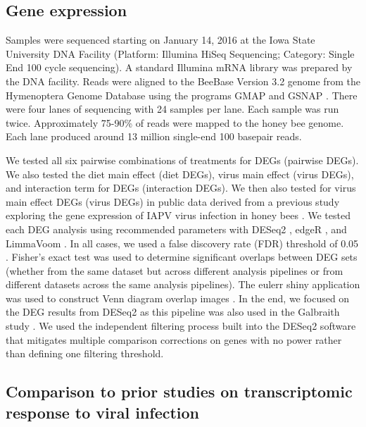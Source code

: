\documentclass{bmcart}
\begin{document}
\begin{linenumbers}
\begin{doublespacing}
\subsection*{Gene expression}

Samples were sequenced starting on January 14, 2016 at the Iowa State University DNA Facility (Platform: Illumina HiSeq Sequencing; Category: Single End 100 cycle sequencing). A standard Illumina mRNA library was prepared by the DNA facility. Reads were aligned to the BeeBase Version 3.2 genome \cite{hbGenome} from the Hymenoptera Genome Database \cite{hymenopteraDB} using the programs GMAP and GSNAP \cite{gsnap}. There were four lanes of sequencing with 24 samples per lane. Each sample was run twice. Approximately 75-90\% of reads were mapped to the honey bee genome. Each lane produced around 13 million single-end 100 basepair reads.

We tested all six pairwise combinations of treatments for DEGs (pairwise DEGs). We also tested the diet main effect (diet DEGs), virus main effect (virus DEGs), and interaction term for DEGs (interaction DEGs). We then also tested for virus main effect DEGs (virus DEGs) in public data derived from a previous study exploring the gene expression of IAPV virus infection in honey bees \cite{galbraith}. We tested each DEG analysis using recommended parameters with DESeq2 \cite{deseq2}, edgeR \cite{edger}, and LimmaVoom \cite{limma}. In all cases, we used a false discovery rate (FDR) threshold of 0.05 \cite{benjamini}. Fisher's exact test was used to determine significant overlaps between DEG sets (whether from the same dataset but across different analysis pipelines or from different datasets across the same analysis pipelines). The eulerr shiny application was used to construct Venn diagram overlap images \cite{euler}. In the end, we focused on the DEG results from DESeq2 \cite{deseq2} as this pipeline was also used in the Galbraith study \cite{galbraith}. We used the independent filtering process built into the DESeq2 software that mitigates multiple comparison corrections on genes with no power rather than defining one filtering threshold.

\subsection*{Comparison to prior studies on transcriptomic response to viral infection}


\end{doublespacing}
\end{linenumbers}
\end{document}
